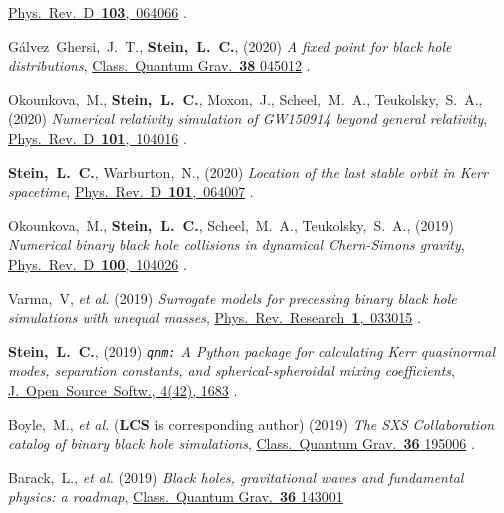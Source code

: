 \begin{etaremune}[start=\value{pubCounter}]
  \href{https://doi.org/10.1103/PhysRevD.103.064066}%
  {Phys.~Rev.~D~{\bf 103},~064066}
  .
\item
  Gálvez~Ghersi,~J.~T.,
  {\bf Stein,~L.~C.},
  (2020)
  {\it A fixed point for black hole distributions},
  \href{https://doi.org/10.1088/1361-6382/abcfd2}
  {Class.~Quantum Grav.~{\bf 38} 045012}
  .
\item
  Okounkova,~M.,
  {\bf Stein,~L.~C.},
  Moxon,~J.,
  Scheel,~M.~A.,
  Teukolsky,~S.~A.,
  (2020)
  {\it Numerical relativity simulation of GW150914 beyond general relativity},
  \href{https://doi.org/10.1103/PhysRevD.101.104016}{Phys.~Rev.~D~{\bf 101},~104016}
  .
\item
  {\bf Stein,~L.~C.},
  Warburton,~N.,
  (2020)
  {\it Location of the last stable orbit in Kerr spacetime},
  \href{https://doi.org/10.1103/PhysRevD.101.064007}{Phys.~Rev.~D~{\bf 101},~064007}
  .
\item
  Okounkova,~M.,
  {\bf Stein,~L.~C.},
  Scheel,~M.~A.,
  Teukolsky,~S.~A.,
  (2019)
  {\it Numerical binary black hole collisions in dynamical Chern-Simons gravity},
  \href{https://doi.org/10.1103/PhysRevD.100.104026}{Phys.~Rev.~D~{\bf 100},~104026}
  .
\item
  Varma,~V, {\it et al.}
  (2019)
  {\it Surrogate models for precessing binary black hole simulations with
  unequal masses},
  \href{https://doi.org/10.1103/PhysRevResearch.1.033015}{Phys.~Rev.~Research~{\bf 1},~033015}
  .
\item
  {\bf Stein,~L.~C.},
  (2019)
  \hspace{0.1em}
  {\it {\tt qnm:} A Python package for calculating Kerr quasinormal modes, separation constants, and spherical-spheroidal mixing coefficients},
  \href{https://doi.org/10.21105/joss.01683}{J.~Open~Source~Softw., 4(42), 1683}
  .
\item
  Boyle,~M., {\it et al.} ({\bf LCS} is corresponding author)
  (2019)
  {\it The SXS Collaboration catalog of binary black hole simulations},
  \href{https://doi.org/10.1088/1361-6382/ab34e2}{Class.~Quantum Grav.~{\bf 36} 195006}
  .
\item
  Barack,~L., {\it et al.}
  (2019)
  {\it Black holes, gravitational waves and fundamental physics: a roadmap},
  \href{https://doi.org/10.1088/1361-6382/ab0587}{Class.~Quantum Grav.~{\bf 36} 143001}

\end{etaremune}
